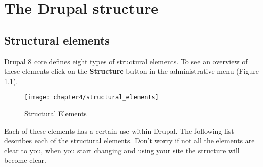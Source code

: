\chapter{The Drupal structure}

\section{Structural elements}

Drupal 8 core defines eight types of structural elements. To see an overview of these elements click on the \textbf{Structure} button in the administrative menu (Figure \ref{fig:structural_elements}).

  \begin{figure}[H]
  	\centering
  	\texttt{[image: chapter4/structural\_elements]}
  	\caption{Structural Elements}
  	\label{fig:structural_elements}
  \end{figure} 
  
  Each of these elements has a certain use within Drupal. The following list describes each of the structural elements. Don't worry if not all the elements are clear to you, when you start changing and using your site the structure will become clear.
  
